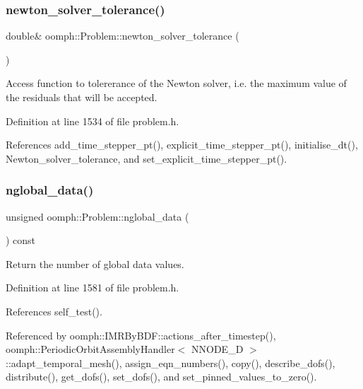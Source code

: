 \subsubsection{\texorpdfstring{newton\+\_\+solver\+\_\+tolerance()}{newton\_solver\_tolerance()}}
{\footnotesize\ttfamily double\& oomph\+::\+Problem\+::newton\+\_\+solver\+\_\+tolerance (\begin{DoxyParamCaption}{ }\end{DoxyParamCaption})\hspace{0.3cm}{\ttfamily [inline]}}



Access function to tolererance of the Newton solver, i.\+e. the maximum value of the residuals that will be accepted. 



Definition at line 1534 of file problem.\+h.



References add\+\_\+time\+\_\+stepper\+\_\+pt(), explicit\+\_\+time\+\_\+stepper\+\_\+pt(), initialise\+\_\+dt(), Newton\+\_\+solver\+\_\+tolerance, and set\+\_\+explicit\+\_\+time\+\_\+stepper\+\_\+pt().

\mbox{\label{classoomph_1_1Problem_a60a9b6861928cf9115110b5bfc7d11a7}} 
\subsubsection{\texorpdfstring{nglobal\+\_\+data()}{nglobal\_data()}}
{\footnotesize\ttfamily unsigned oomph\+::\+Problem\+::nglobal\+\_\+data (\begin{DoxyParamCaption}{ }\end{DoxyParamCaption}) const\hspace{0.3cm}{\ttfamily [inline]}}



Return the number of global data values. 



Definition at line 1581 of file problem.\+h.



References self\+\_\+test().



Referenced by oomph\+::\+I\+M\+R\+By\+B\+D\+F\+::actions\+\_\+after\+\_\+timestep(), oomph\+::\+Periodic\+Orbit\+Assembly\+Handler$<$ N\+N\+O\+D\+E\+\_\+D $>$\+::adapt\+\_\+temporal\+\_\+mesh(), assign\+\_\+eqn\+\_\+numbers(), copy(), describe\+\_\+dofs(), distribute(), get\+\_\+dofs(), set\+\_\+dofs(), and set\+\_\+pinned\+\_\+values\+\_\+to\+\_\+zero().

